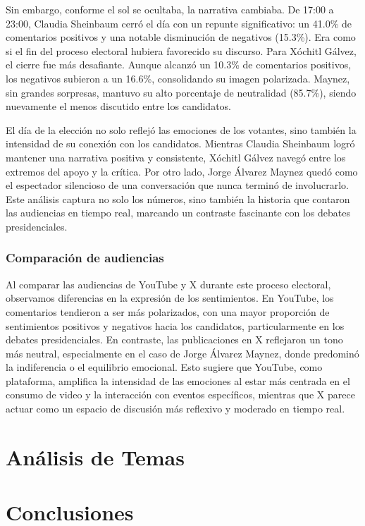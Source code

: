 \documentclass[10pt, a4paper]{article}
\begin{document}
	Sin embargo, conforme el sol se ocultaba, la narrativa cambiaba. De 17:00 a 23:00, Claudia Sheinbaum cerró el día con un repunte significativo: un 41.0\% de comentarios positivos y una notable disminución de negativos (15.3\%). Era como si el fin del proceso electoral hubiera favorecido su discurso. Para Xóchitl Gálvez, el cierre fue más desafiante. Aunque alcanzó un 10.3\% de comentarios positivos, los negativos subieron a un 16.6\%, consolidando su imagen polarizada. Maynez, sin grandes sorpresas, mantuvo su alto porcentaje de neutralidad (85.7\%), siendo nuevamente el menos discutido entre los candidatos.
	
	El día de la elección no solo reflejó las emociones de los votantes, sino también la intensidad de su conexión con los candidatos. Mientras Claudia Sheinbaum logró mantener una narrativa positiva y consistente, Xóchitl Gálvez navegó entre los extremos del apoyo y la crítica. Por otro lado, Jorge Álvarez Maynez quedó como el espectador silencioso de una conversación que nunca terminó de involucrarlo. Este análisis captura no solo los números, sino también la historia que contaron las audiencias en tiempo real, marcando un contraste fascinante con los debates presidenciales.
	
	\subsubsection{Comparación de audiencias}
	Al comparar las audiencias de YouTube y X durante este proceso electoral, observamos diferencias en la expresión de los sentimientos. En YouTube, los comentarios tendieron a ser más polarizados, con una mayor proporción de sentimientos positivos y negativos hacia los candidatos, particularmente en los debates presidenciales. En contraste, las publicaciones en X reflejaron un tono más neutral, especialmente en el caso de Jorge Álvarez Maynez, donde predominó la indiferencia o el equilibrio emocional. Esto sugiere que YouTube, como plataforma, amplifica la intensidad de las emociones al estar más centrada en el consumo de video y la interacción con eventos específicos, mientras que X parece actuar como un espacio de discusión más reflexivo y moderado en tiempo real.
	
	\section{Análisis de Temas}
	
	\section{Conclusiones}
	
	
	
	
	
	\printbibliography
	
	
	
\end{document}
